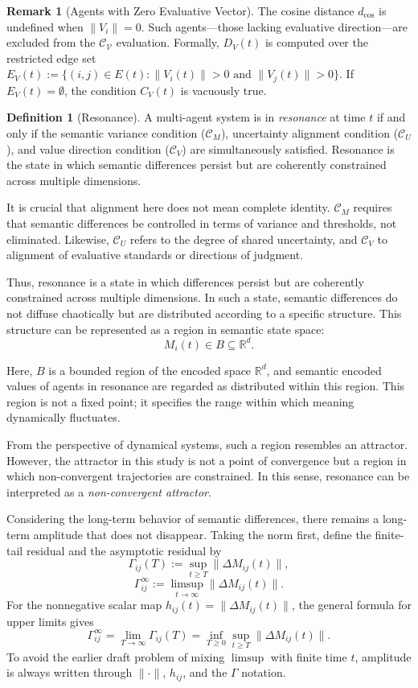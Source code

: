 \documentclass[11pt,a4paper]{article}
\theoremstyle{definition}
\newtheorem{definition}{Definition}[section]
\newtheorem{remark}{Remark}[section]
\begin{document}
\begin{remark}[Agents with Zero Evaluative Vector]
The cosine distance $d_{\cos}$ is undefined when $\|V_i\| = 0$. Such agents---those lacking evaluative direction---are excluded from the $\mathcal{C_V}$ evaluation. Formally, $D_V(t)$ is computed over the restricted edge set $E_V(t) := \{(i,j) \in E(t) : \|V_i(t)\| > 0 \text{ and } \|V_j(t)\| > 0\}$. If $E_V(t) = \emptyset$, the condition $C_V(t)$ is vacuously true.
\end{remark}

\begin{definition}[Resonance]
A multi-agent system is in \textit{resonance} at time $t$ if and only if the semantic variance condition ($\mathcal{C}_M$), uncertainty alignment condition ($\mathcal{C}_U$), and value direction condition ($\mathcal{C}_V$) are simultaneously satisfied. Resonance is the state in which semantic differences persist but are coherently constrained across multiple dimensions.
\end{definition}

It is crucial that alignment here does not mean complete identity. $\mathcal{C}_M$ requires that semantic differences be controlled in terms of variance and thresholds, not eliminated. Likewise, $\mathcal{C}_U$ refers to the degree of shared uncertainty, and $\mathcal{C}_V$ to alignment of evaluative standards or directions of judgment.

Thus, resonance is a state in which differences persist but are coherently constrained across multiple dimensions. In such a state, semantic differences do not diffuse chaotically but are distributed according to a specific structure. This structure can be represented as a region in semantic state space:
\[
M_i(t) \in B \subseteq \mathbb{R}^d.
\]

Here, $B$ is a bounded region of the encoded space $\mathbb{R}^d$, and semantic encoded values of agents in resonance are regarded as distributed within this region. This region is not a fixed point; it specifies the range within which meaning dynamically fluctuates.

From the perspective of dynamical systems, such a region resembles an attractor. However, the attractor in this study is not a point of convergence but a region in which non-convergent trajectories are constrained. In this sense, resonance can be interpreted as a \textit{non-convergent attractor}.

Considering the long-term behavior of semantic differences, there remains a long-term amplitude that does not disappear. Taking the norm first, define the finite-tail residual and the asymptotic residual by
\[
\Gamma_{ij}(T)
:=
\sup_{t \ge T}
\|\Delta M_{ij}(t)\|,
\]
\[
\Gamma_{ij}^{\infty}
:=
\limsup_{t \to \infty}
\|\Delta M_{ij}(t)\|.
\]
For the nonnegative scalar map $h_{ij}(t)=\|\Delta M_{ij}(t)\|$, the general formula for upper limits gives
\[
\Gamma_{ij}^{\infty}
=
\lim_{T\to\infty}\Gamma_{ij}(T)
=
\inf_{T\ge 0}
\sup_{t\ge T}
\|\Delta M_{ij}(t)\|.
\]
To avoid the earlier draft problem of mixing $\limsup$ with finite time $t$, amplitude is always written through $\|\cdot\|$, $h_{ij}$, and the $\Gamma$ notation.
\end{document}
